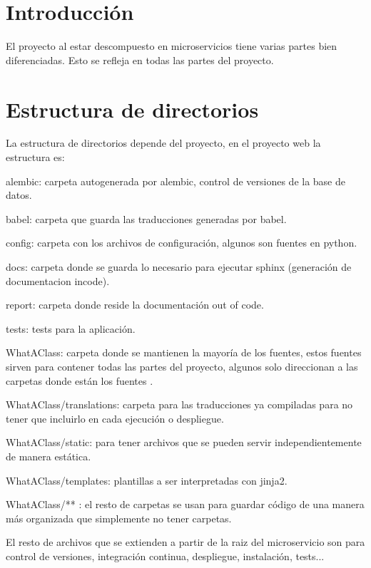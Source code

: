 
\section{Introducción}

El proyecto al estar descompuesto en microservicios tiene varias partes bien diferenciadas. Esto se refleja en todas las partes del proyecto. 

\section{Estructura de directorios}

La estructura de directorios depende del proyecto, en el proyecto web la estructura es:
\begin{list}{-}{}
\item alembic: carpeta autogenerada por alembic, control de versiones de la base de datos.
\item babel: carpeta que guarda las traducciones generadas por babel.
\item config: carpeta con los archivos de configuración, algunos son fuentes en python.
\item docs: carpeta donde se guarda lo necesario para ejecutar sphinx (generación de documentacion incode).
\item report: carpeta donde reside la documentación out of code.
\item tests: tests para la aplicación.
\item WhatAClass: carpeta donde se mantienen la mayoría de los fuentes, estos fuentes sirven para contener todas las partes del proyecto, algunos solo direccionan a las carpetas donde están los fuentes .
\item WhatAClass/translations: carpeta para las traducciones ya compiladas para no tener que incluirlo en cada ejecución o despliegue.
\item WhatAClass/static: para tener archivos que se pueden servir independientemente de manera estática.
\item WhatAClass/templates: plantillas a ser interpretadas con jinja2.
\item WhatAClass/** : el resto de carpetas se usan para guardar código de una manera más organizada que simplemente no tener carpetas.
\item El resto de archivos que se extienden a partir de la raiz del microservicio son para control de versiones, integración continua, despliegue, instalación, tests...
\end{list}
